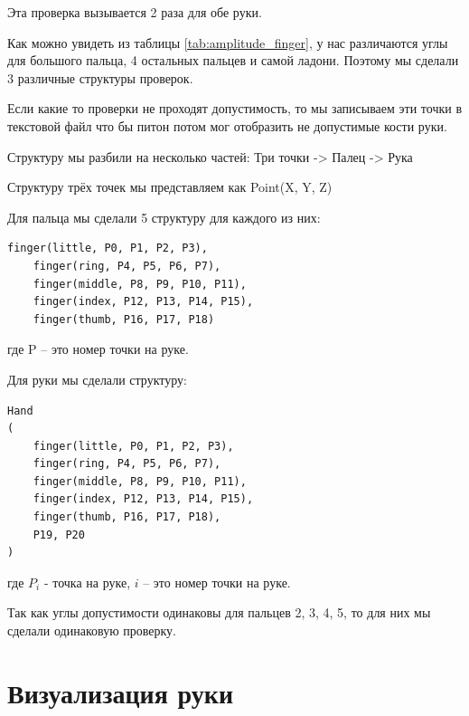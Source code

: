 \hspace{0.6cm}Эта проверка вызывается 2 раза для обе руки.

\hspace{0.6cm} Как можно увидеть из таблицы \ref{tab:amplitude_finger}, у нас различаются углы для большого пальца, 4 остальных пальцев и самой ладони. Поэтому мы сделали 3 различные структуры проверок.

\hspace{0.6cm} Если какие то проверки не проходят допустимость, то мы записываем эти точки в текстовой файл что бы питон потом мог отобразить не допустимые кости руки.

\hspace{0.6cm} Структуру мы разбили на несколько частей: Три точки -> Палец -> Рука

\hspace{0.6cm} Структуру трёх точек мы представляем как Point(X, Y, Z)

\hspace{0.6cm} Для пальца мы сделали 5 структуру для каждого из них:
	
\begin{lstlisting}[caption=Листинг структур пальцев, label=struct:finger]
	finger(little, P0, P1, P2, P3),
	finger(ring, P4, P5, P6, P7),
	finger(middle, P8, P9, P10, P11),
	finger(index, P12, P13, P14, P15),
	finger(thumb, P16, P17, P18)
\end{lstlisting}
\hspace{0.6cm} где P – это номер точки на руке.

\hspace{0.6cm} Для руки мы сделали структуру:
\begin{lstlisting}[caption=Листинг структуры руки, label=struct:hand]
Hand
(
	finger(little, P0, P1, P2, P3),
	finger(ring, P4, P5, P6, P7),
	finger(middle, P8, P9, P10, P11),
	finger(index, P12, P13, P14, P15),
	finger(thumb, P16, P17, P18),
	P19, P20
)
\end{lstlisting}

\hspace{0.6cm} где $P_{i}$ - точка на руке, $i$ – это номер точки на руке.

\hspace{0.6cm} Так как углы допустимости одинаковы для пальцев 2, 3, 4, 5, то для них мы сделали одинаковую проверку.

\section{Визуализация руки}

